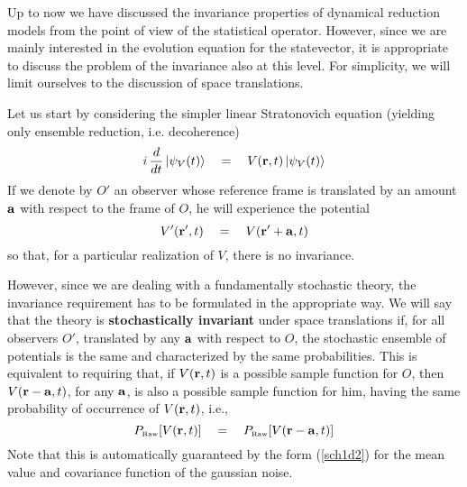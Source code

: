 \documentclass[10pt,a4paper]{article}
\begin{document}
Up to now we have discussed the invariance properties of dynamical
reduction models from the point of view of the statistical
operator. However, since we are mainly interested in the evolution
equation for the statevector, it is appropriate to discuss the
problem of the invariance also at this level. For simplicity, we
will limit ourselves to the discussion of space translations.

Let us start by considering the simpler linear Stratonovich
equation (yielding only ensemble reduction, i.e. decoherence)
\begin{equation} \label{sicdup}
i\, \frac{d}{dt}\, |\psi_{V}(t)\rangle \quad = \quad V({\bf r},
t)\, |\psi_{V}(t)\rangle
\end{equation}
If we denote by $O'$ an observer whose reference frame is
translated by an amount ${\bf a}$ with respect to the frame of
$O$, he will experience the potential
\begin{equation}
V'({\bf r}', t) \quad = \quad V({\bf r}' + {\bf a}, t)
\end{equation}
so that, for a particular realization of $V$, there is no
invariance.

However, since we are dealing with a fundamentally stochastic
theory, the invariance requirement has to be formulated in the
appropriate way. We will say that the theory is {\bf
stochastically invariant} under space translations if, for all
observers $O'$, translated by any ${\bf a}$ with respect to $O$,
the stochastic ensemble of potentials is the same and
characterized by the same probabilities. This is equivalent to
requiring that, if $V({\bf r}, t)$ is a possible sample function
for $O$, then $V({\bf r} - {\bf a}, t)$, for any ${\bf a}$, is
also a possible sample function for him, having the same
probability of occurrence of $V({\bf r}, t)$, i.e.,
\begin{equation} \label{lwbc}
P_{\makebox{\tiny Raw}}[V({\bf r},t)] \quad = \quad
P_{\makebox{\tiny Raw}}[V({\bf r} - {\bf a},t)]
\end{equation}
Note that this is automatically guaranteed by the form
(\ref{sch1d2}) for the mean value and covariance function of the
gaussian noise.
\end{document}
